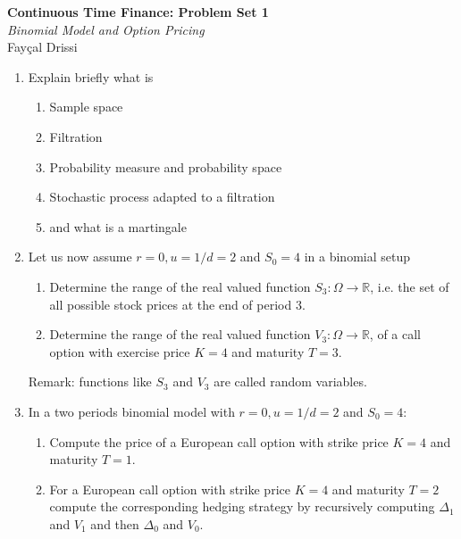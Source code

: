 \documentclass[11pt,a4,table]{article}
\begin{document}
\vspace*{-0.7in}

\begin{center}
 \textbf{Continuous Time Finance: Problem Set 1} \\
\textit{Binomial Model and Option Pricing} \\
Fayçal Drissi \\
\end{center} 


\begin{enumerate}
    \item Explain briefly what is 
    \begin{enumerate} 
    \item Sample space 
    \item Filtration 
    \item Probability measure and probability space
    \item Stochastic process adapted to a filtration
    \item and what is a martingale
	\end{enumerate}
    \item 
    Let us now assume $r=0,u=1/d=2$ and $S_0=4$ in a binomial setup
    \begin{enumerate}
    
        \item Determine the range of the real valued function $S_3:\Omega\rightarrow\mathbb{R}$, i.e. the set of all possible stock prices at the end of period 3.
    
        \item Determine the range of the real valued function $V_3:\Omega\rightarrow\mathbb{R}$, of a call option with exercise price $K=4$ and maturity $T=3$.
    \end{enumerate}
    
    Remark: functions like $S_3$ and $V_3$ are called random variables.
    
  
    \item In a two periods binomial model with $r=0, u=1/d=2$ and $S_0 = 4$:
    
    \begin{enumerate}
        \item Compute the price of a European call option with strike price $K=4$ and maturity $T=1$.
        
        \item For a European call option with strike price $K=4$ and maturity $T=2$ compute the corresponding hedging strategy by recursively computing $\Delta_1$ and $V_1$ and then $\Delta_0$ and $V_0$.
    \end{enumerate}
    

\end{enumerate}
\end{document}
